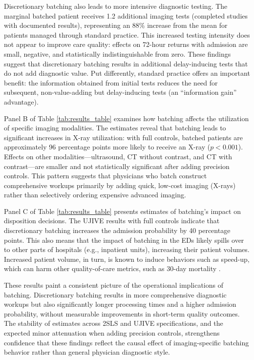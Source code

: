 \documentclass[,,blindrev]{informs}
\begin{document}
Discretionary batching also leads to more intensive diagnostic testing.
The marginal batched patient receives 1.2 additional imaging tests
(completed studies with documented results), representing an 88\%
increase from the mean for patients managed through standard practice.
This increased testing intensity does not appear to improve care
quality: effects on 72-hour returns with admission are small, negative,
and statistically indistinguishable from zero. These findings suggest
that discretionary batching results in additional delay-inducing tests
that do not add diagnostic value. Put differently, standard practice
offers an important benefit: the information obtained from initial tests
reduces the need for subsequent, non-value-adding but delay-inducing
tests (an ``information gain'' advantage).

Panel B of Table \ref{tab:results_table} examines how batching affects
the utilization of specific imaging modalities. The estimates reveal
that batching leads to significant increases in X-ray utilization: with
full controls, batched patients are approximately 96 percentage points
more likely to receive an X-ray (\(p<0.001\)). Effects on other
modalities---ultrasound, CT without contrast, and CT with contrast---are
smaller and not statistically significant after adding precision
controls. This pattern suggests that physicians who batch construct
comprehensive workups primarily by adding quick, low-cost imaging
(X-rays) rather than selectively ordering expensive advanced imaging.

Panel C of Table \ref{tab:results_table} presents estimates of
batching's impact on disposition decisions. The UJIVE results with full
controls indicate that discretionary batching increases the admission
probability by 40 percentage points. This also means that the impact of
batching in the EDs likely spills over to other parts of hospitals
(e.g., inpatient units), increasing their patient volumes. Increased
patient volume, in turn, is known to induce behaviors such as speed-up,
which can harm other quality-of-care metrics, such as 30-day mortality
\citep{Song2019}.

These results paint a consistent picture of the operational implications
of batching. Discretionary batching results in more comprehensive
diagnostic workups but also significantly longer processing times and a
higher admission probability, without measurable improvements in
short-term quality outcomes. The stability of estimates across 2SLS and
UJIVE specifications, and the expected minor attenuation when adding
precision controls, strengthens confidence that these findings reflect
the causal effect of imaging-specific batching behavior rather than
general physician diagnostic style.
\end{document}
